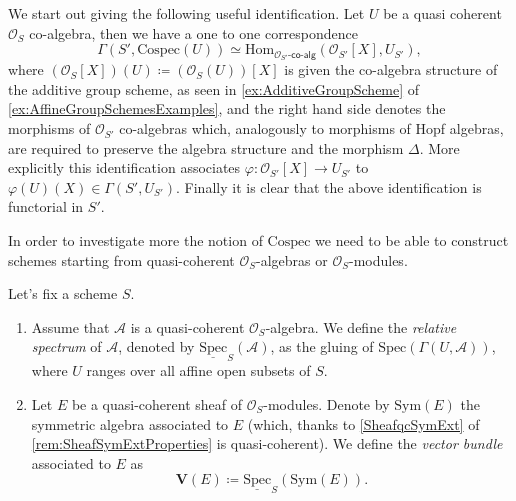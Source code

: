 \documentclass[../Main]{subfiles}
\begin{document}
\begin{rem}[]\label{rem:CospecSections}
	We start out giving the following useful identification.
	Let $U$ be a quasi coherent $\mathcal{O}_{ S }$ co-algebra,
	then we have a one to one correspondence
	\begin{equation*}
	\Gamma(S', \mathrm{Cospec}(U)) \simeq
	\mathrm{Hom}_{ \mathcal{O}_{ S' }\text{-}\mathsf{co}\text{-}\mathsf{alg}} 
	\left( \mathcal{O}_{ S' }[X], U_{S'} \right)
	,\end{equation*}
	where $(\mathcal{O}_{ S }[X])(U) \coloneqq (\mathcal{O}_{ S }(U))[X]$ 
	is given the co-algebra structure of the additive group scheme, as seen in
	\cref{ex:AdditiveGroupScheme} of \cref{ex:AffineGroupSchemesExamples},
	and the right hand side denotes the morphisms of $\mathcal{O}_{ S' }$
	co-algebras which, analogously to morphisms of Hopf algebras, 
	are required to preserve the algebra structure and the morphism $\Delta$.
	More explicitly this identification associates
	$\varphi\colon \mathcal{O}_{ S' }[X] \to U_{S'}$ to
	$\varphi(U)(X) \in \Gamma(S', U_{S'})$.
	Finally it is clear that the above identification is functorial in $S'$.
\end{rem}


\noindent
In order to investigate more the notion of $\mathrm{Cospec}$ we need to 
be able to construct schemes starting from quasi-coherent $\mathcal{O}_{ S }$-algebras
or $\mathcal{O}_{ S }$-modules.


\begin{defn}
	Let's fix a scheme $S$.
\begin{enumerate}
	\item Assume that $\mathscr{A}$ is a quasi-coherent $\mathcal{O}_{ S }$-algebra.
		We define the {\em relative spectrum} of $\mathscr{A}$, denoted by
		$\underline{\mathrm{Spec}}_S(\mathscr{A})$, as the gluing of
		$\mathrm{Spec}(\Gamma(U, \mathscr{A}))$, where $U$ ranges
		over all affine open subsets of $S$.

	\item  Let $E$ be a quasi-coherent sheaf of $\mathcal{O}_{ S }$-modules.
		Denote by $\mathrm{Sym}(E)$ the symmetric algebra associated to 
		$E$ (which, thanks to \cref{SheafqcSymExt} of
		\cref{rem:SheafSymExtProperties} is quasi-coherent).
		We define the {\em vector bundle} associated to $E$ as
		\begin{equation*}
			\mathbf{V}(E) \coloneqq
			\underline{\mathrm{Spec}}_S (\mathrm{Sym}(E))
		.\end{equation*}
\end{enumerate}
\end{defn}
\end{document}
